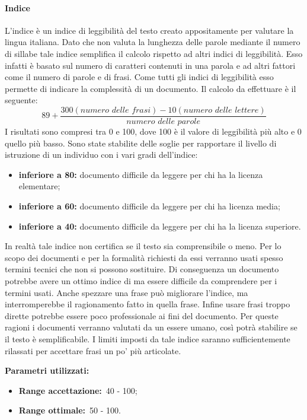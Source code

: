 			\paragraph{Indice }
			\label{sec:3.7.2.1}
				L'indice  è un indice di leggibilità del testo creato appositamente per valutare la lingua italiana. Dato che non valuta la lunghezza delle parole mediante il numero di sillabe tale indice semplifica il calcolo rispetto ad altri indici di leggibilità. Esso infatti è basato sul numero di caratteri contenuti in una parola e ad altri fattori come il numero di parole e di frasi. Come tutti gli indici di leggibilità esso permette di indicare la complessità di un documento. Il calcolo da effettuare è il seguente:
				\[89+\frac{300(numero\,\, delle\,\, frasi) - 10(numero\,\, delle\,\, lettere)}{numero\,\, delle\,\, parole}\]
				I risultati sono compresi tra 0 e 100, dove 100 è il valore di leggibilità più alto e 0 quello più basso. Sono state stabilite delle soglie per rapportare il livello di istruzione di un individuo con i vari gradi dell'indice:
				\begin{itemize}
					\item \textbf{inferiore a 80:} documento difficile da leggere per chi ha la licenza elementare;
					\item \textbf{inferiore a 60:} documento difficile da leggere per chi ha licenza media;
					\item \textbf{inferiore a 40:} documento difficile da leggere per chi ha la licenza superiore.
				\end{itemize}
				In realtà tale indice non certifica se il testo sia comprensibile o meno. Per lo scopo dei documenti e per la formalità richiesti da essi verranno usati spesso termini tecnici che non si possono sostituire. Di conseguenza un documento potrebbe avere un ottimo indice di  ma essere difficile da comprendere per i termini usati. Anche spezzare una frase può migliorare l'indice, ma interromperebbe il ragionamento fatto in quella frase. Infine usare frasi troppo dirette potrebbe essere poco professionale ai fini del documento. Per queste ragioni i documenti verranno valutati da un essere umano, così potrà stabilire se il testo è semplificabile. I limiti imposti da tale indice saranno sufficientemente rilassati per accettare frasi un po' più articolate.
				
				\textbf{Parametri utilizzati:}
				\begin{itemize}
					\item \textbf{Range accettazione:}\ 40 - 100;
					\item \textbf{Range ottimale:}\ 50 - 100.
				\end{itemize}
